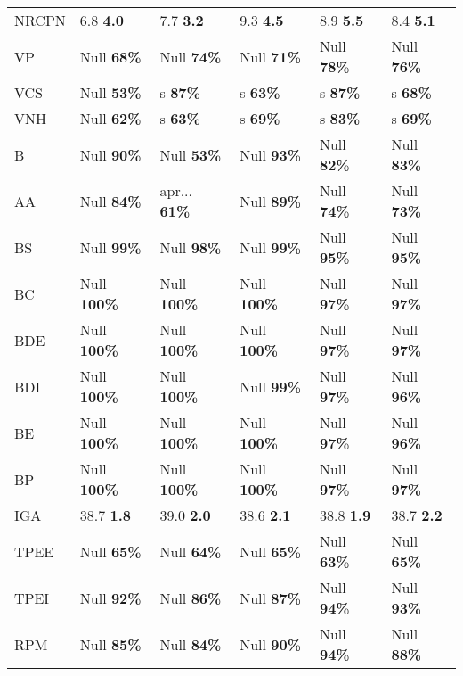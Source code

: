 \begin{tabular}{l|lllll}
    NRCPN &     6.8 \textbf{4.0} &     7.7 \textbf{3.2} &     9.3 \textbf{4.5} &     8.9 \textbf{5.5} &     8.4 \textbf{5.1} \\
       VP &   Null \textbf{68\%} &   Null \textbf{74\%} &   Null \textbf{71\%} &   Null \textbf{78\%} &   Null \textbf{76\%} \\
      VCS &   Null \textbf{53\%} &      s \textbf{87\%} &      s \textbf{63\%} &      s \textbf{87\%} &      s \textbf{68\%} \\
      VNH &   Null \textbf{62\%} &      s \textbf{63\%} &      s \textbf{69\%} &      s \textbf{83\%} &      s \textbf{69\%} \\
        B &   Null \textbf{90\%} &   Null \textbf{53\%} &   Null \textbf{93\%} &   Null \textbf{82\%} &   Null \textbf{83\%} \\
       AA &   Null \textbf{84\%} & apr... \textbf{61\%} &   Null \textbf{89\%} &   Null \textbf{74\%} &   Null \textbf{73\%} \\
       BS &   Null \textbf{99\%} &   Null \textbf{98\%} &   Null \textbf{99\%} &   Null \textbf{95\%} &   Null \textbf{95\%} \\
       BC &  Null \textbf{100\%} &  Null \textbf{100\%} &  Null \textbf{100\%} &   Null \textbf{97\%} &   Null \textbf{97\%} \\
      BDE &  Null \textbf{100\%} &  Null \textbf{100\%} &  Null \textbf{100\%} &   Null \textbf{97\%} &   Null \textbf{97\%} \\
      BDI &  Null \textbf{100\%} &  Null \textbf{100\%} &   Null \textbf{99\%} &   Null \textbf{97\%} &   Null \textbf{96\%} \\
       BE &  Null \textbf{100\%} &  Null \textbf{100\%} &  Null \textbf{100\%} &   Null \textbf{97\%} &   Null \textbf{96\%} \\
       BP &  Null \textbf{100\%} &  Null \textbf{100\%} &  Null \textbf{100\%} &   Null \textbf{97\%} &   Null \textbf{97\%} \\
      IGA &    38.7 \textbf{1.8} &    39.0 \textbf{2.0} &    38.6 \textbf{2.1} &    38.8 \textbf{1.9} &    38.7 \textbf{2.2} \\
     TPEE &   Null \textbf{65\%} &   Null \textbf{64\%} &   Null \textbf{65\%} &   Null \textbf{63\%} &   Null \textbf{65\%} \\
     TPEI &   Null \textbf{92\%} &   Null \textbf{86\%} &   Null \textbf{87\%} &   Null \textbf{94\%} &   Null \textbf{93\%} \\
      RPM &   Null \textbf{85\%} &   Null \textbf{84\%} &   Null \textbf{90\%} &   Null \textbf{94\%} &   Null \textbf{88\%} \\

\end{tabular}
